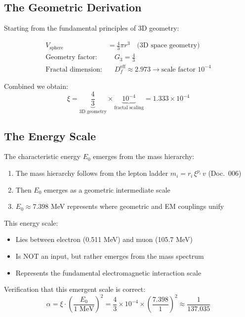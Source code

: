 	\subsection{The Geometric Derivation}
	
	Starting from the fundamental principles of 3D geometry:
	
	\begin{align}
		V_{\text{sphere}} &= \frac{4}{3}\pi r^3 \quad \text{(3D space geometry)}\\
		\text{Geometry factor:} & \quad G_3 = \frac{4}{3}\\
		\text{Fractal dimension:} & \quad D_f^{\text{eff}} \approx 2.973 \rightarrow \text{scale factor } 10^{-4}
	\end{align}
	
	Combined we obtain:
	\begin{equation}
		\xi = \underbrace{\frac{4}{3}}_{\text{3D geometry}} \times \underbrace{10^{-4}}_{\text{fractal scaling}} = 1.333 \times 10^{-4}
	\end{equation}
	
	\subsection{The Energy Scale}
	
	The characteristic energy $E_0$ emerges from the mass hierarchy:
	
	\begin{enumerate}
		\item The mass hierarchy follows from the lepton ladder $m_i = r_i\,\xi^{p_i}\,v$ (Doc.~006)
		\item Then $E_0$ emerges as a geometric intermediate scale
		\item $E_0 \approx 7.398$ MeV represents where geometric and EM couplings unify
	\end{enumerate}
	
	This energy scale:
	\begin{itemize}
		\item Lies between electron (0.511 MeV) and muon (105.7 MeV)
		\item Is NOT an input, but rather emerges from the mass spectrum
		\item Represents the fundamental electromagnetic interaction scale
	\end{itemize}
	
	Verification that this emergent scale is correct:
	\begin{equation}
		\alpha = \xi \cdot \left(\frac{E_0}{1 \text{ MeV}}\right)^2 = \frac{4}{3} \times 10^{-4} \times \left(\frac{7.398}{1}\right)^2 \approx \frac{1}{137.035}
	\end{equation}
	
